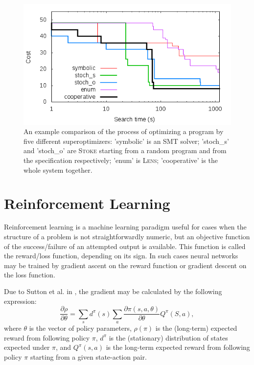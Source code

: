 \documentclass[12pt,twoside]{reedthesis}
\begin{document}
        \begin{figure}
            \centering
            \includegraphics[scale=0.5]{scaling}
            \caption{An example comparison of the process of optimizing a program by five different superoptimizers: 'symbolic' is an SMT solver; 'stoch\_s' and 'stoch\_o' are \textsc{Stoke} starting from a random program and from the specification respectively; 'enum' is \textsc{Lens}; 'cooperative' is the whole system together.}
        \end{figure}


    \section{Reinforcement Learning}
        Reinforcement learning is a machine learning paradigm useful for cases when the structure of a problem is not straightforwardly numeric, but an objective function of the success/failure of an attempted output is available. This function is called the reward/loss function, depending on its sign. In such cases neural networks may be trained by gradient ascent on the reward function or gradient descent on the loss function.
        
        Due to Sutton et al. in \cite{sutton1999policygradient}, the gradient may be calculated by the following expression:
        \[
            \frac{\partial \rho}{\partial \theta} = \sum_s d^\pi(s) \sum_a \frac{\partial \pi(s,a, \theta)}{\partial \theta}Q^\pi(S,a),
        \]
        where $\theta$ is the vector of policy parameters, $\rho(\pi)$ is the (long-term) expected reward from following policy $\pi$, $d^\pi$ is the (stationary) distribution of states expected under $\pi$, and $Q^\pi(s,a)$ is the long-term expected reward from following policy $\pi$ starting from a given state-action pair.
        
\end{document}
